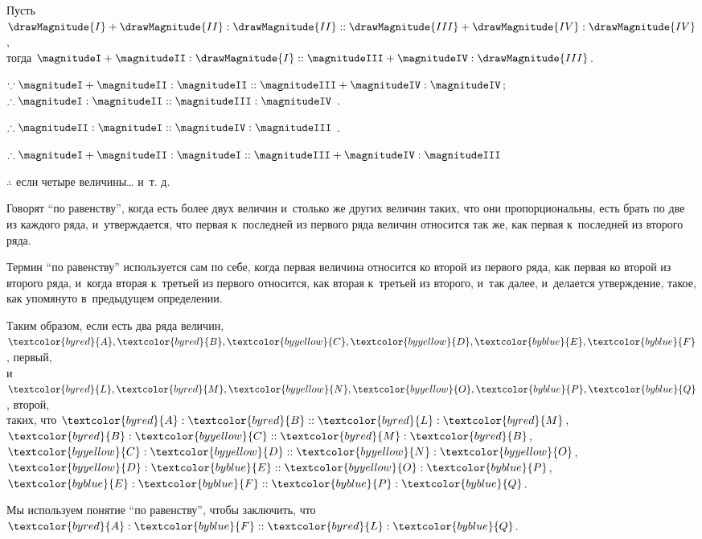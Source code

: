 \documentclass[letters,booklanguage=russian]{byrnebook}
\begin{document}
\begin{center}
Пусть $ \drawMagnitude{I} + \drawMagnitude{II} : \drawMagnitude{II} ::  \drawMagnitude{III} + \drawMagnitude{IV} : \drawMagnitude{IV}$,\\
тогда $\magnitudeI + \magnitudeII : \drawMagnitude{I} :: \magnitudeIII + \magnitudeIV : \drawMagnitude{III}$.

$\because \magnitudeI + \magnitudeII : \magnitudeII :: \magnitudeIII + \magnitudeIV : \magnitudeIV$;\\
$\therefore \magnitudeI : \magnitudeII :: \magnitudeIII : \magnitudeIV$ .

$\therefore \magnitudeII : \magnitudeI :: \magnitudeIV : \magnitudeIII$ .

$\therefore \magnitudeI + \magnitudeII : \magnitudeI :: \magnitudeIII + \magnitudeIV : \magnitudeIII$

$\therefore$ если четыре величины… и~т. д.
\end{center}

Говорят \enquote{по равенству}, когда есть более двух величин и~столько же других величин таких, что они пропорциональны, есть брать по две из каждого ряда, и~утверждается, что первая к~последней из первого ряда величин относится так же, как первая к~последней из второго ряда.

\vfill\pagebreak

\def\varA{\textcolor{byred}{A}}
\def\varB{\textcolor{byred}{B}}
\def\varC{\textcolor{byyellow}{C}}
\def\varD{\textcolor{byyellow}{D}}
\def\varE{\textcolor{byblue}{E}}
\def\varF{\textcolor{byblue}{F}}
\def\varL{\textcolor{byred}{L}}
\def\varM{\textcolor{byred}{M}}
\def\varN{\textcolor{byyellow}{N}}
\def\varO{\textcolor{byyellow}{O}}
\def\varP{\textcolor{byblue}{P}}
\def\varQ{\textcolor{byblue}{Q}}
Термин \enquote{по равенству} используется сам по себе, когда первая величина относится ко второй из первого ряда, как первая ко второй из второго ряда, и~когда вторая к~третьей из первого относится, как вторая к~третьей из второго, и~так далее, и~делается утверждение, такое, как упомянуто в~предыдущем определении.

\begin{center}
Таким образом, если есть два ряда величин,\\
$\varA, \varB, \varC, \varD, \varE, \varF$, первый,\\
и $\varL, \varM, \varN, \varO, \varP, \varQ$, второй,\\
таких, что $\varA : \varB :: \varL : \varM$, $\varB : \varC :: \varM : \varB$, $\varC : \varD :: \varN : \varO$, $\varD : \varE :: \varO : \varP$, $\varE : \varF :: \varP : \varQ$.

Мы используем понятие \enquote{по равенству}, чтобы заключить, что $\varA : \varF :: \varL : \varQ$.
\end{center}
\end{document}
